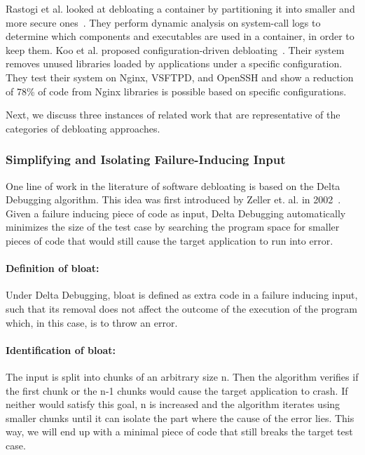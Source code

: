 Rastogi et al. looked at debloating a container by partitioning it into smaller and more secure ones~\cite{rastogi2017Cimplifier}. They perform dynamic analysis on system-call logs to determine which components and executables are used in a container, in order to keep them. Koo et al. proposed configuration-driven debloating~\cite{Koo:2019:CSD:3301417.3312501}. Their system removes unused libraries loaded by applications under a specific configuration. They test their system on Nginx, VSFTPD, and OpenSSH and show a reduction of 78\% of code from Nginx libraries is possible based on specific configurations.

Next, we discuss three instances of related work that are representative of the categories of debloating approaches.

\subsubsection{Simplifying and Isolating Failure-Inducing Input}
One line of work in the literature of software debloating is based on the Delta Debugging algorithm. This idea was first introduced by Zeller et. al. in 2002~\cite{zeller2002Delta}.
Given a failure inducing piece of code as input, Delta Debugging automatically minimizes the size of the test case by searching the program space for smaller pieces of code that would still cause the target application to run into error.

\paragraph{Definition of bloat:} Under Delta Debugging, bloat is defined as extra code in a failure inducing input, such that its removal does not affect the outcome of the execution of the program which, in this case, is to throw an error.

\paragraph{Identification of bloat:} The input is split into chunks of an arbitrary size n. Then the algorithm verifies if the first chunk or the n-1 chunks would cause the target application to crash. If neither would satisfy this goal, n is increased and the algorithm iterates using smaller chunks until it can isolate the part where the cause of the error lies. This way, we will end up with a minimal piece of code that still breaks the target test case.
